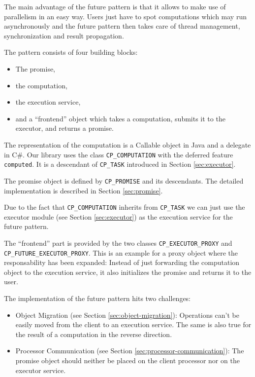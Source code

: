 The main advantage of the future pattern is that it allows to make use of parallelism in an easy way.
Users just have to spot computations which may run asynchronously and the future pattern then takes care of thread management, synchronization and result propagation.

The pattern consists of four building blocks:
\begin{itemize}
 \item The promise,
 \item the computation,
 \item the execution service,
 \item and a ``frontend'' object which takes a computation, submits it to the executor, and returns a promise.
\end{itemize}

The representation of the computation is a Callable object in Java and a delegate in C\#.
Our library uses the class \lstinline!CP_COMPUTATION! with the deferred feature \lstinline!computed!.
It is a descendant of \lstinline!CP_TASK! introduced in Section \ref{sec:executor}.

The promise object is defined by \lstinline!CP_PROMISE! and its descendants.
The detailed implementation is described in Section \ref{sec:promise}.

Due to the fact that \lstinline!CP_COMPUTATION! inherits from \lstinline!CP_TASK! we can just use the executor module (see Section \ref{sec:executor}) as the execution service for the future pattern.

The ``frontend'' part is provided by the two classes \lstinline!CP_EXECUTOR_PROXY! and \lstinline!CP_FUTURE_EXECUTOR_PROXY!.
This is an example for a proxy object where the responsability has been expanded:
Instead of just forwarding the computation object to the execution service, it also initializes the promise and returns it to the user.

The implementation of the future pattern hits two challenges:
\begin{itemize}
 \item Object Migration (see Section \ref{sec:object-migration}):
 Operations can't be easily moved from the client to an execution service.
 The same is also true for the result of a computation in the reverse direction.
 \item Processor Communication (see Section \ref{sec:processor-communication}):
 The promise object should neither be placed on the client processor nor on the executor service.
\end{itemize}


